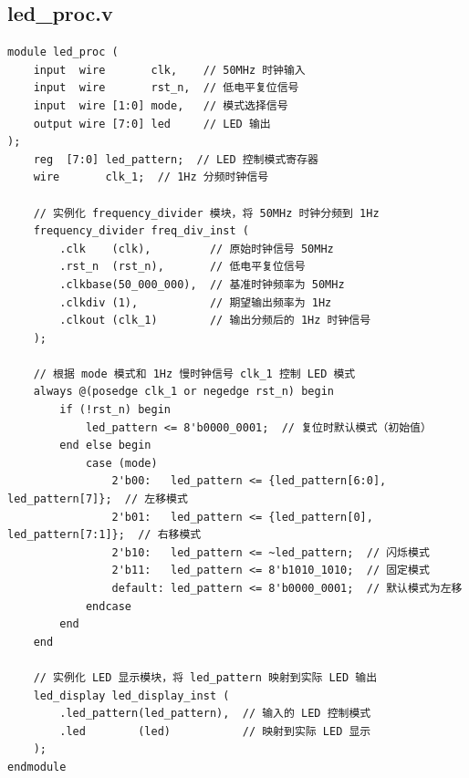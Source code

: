 \documentclass[a4paper,10pt]{article}
\begin{document}
\subsection{led_proc.v}
\begin{lstlisting}[caption=led_proc.v]
module led_proc (
    input  wire       clk,    // 50MHz 时钟输入
    input  wire       rst_n,  // 低电平复位信号
    input  wire [1:0] mode,   // 模式选择信号
    output wire [7:0] led     // LED 输出
);
    reg  [7:0] led_pattern;  // LED 控制模式寄存器
    wire       clk_1;  // 1Hz 分频时钟信号

    // 实例化 frequency_divider 模块，将 50MHz 时钟分频到 1Hz
    frequency_divider freq_div_inst (
        .clk    (clk),         // 原始时钟信号 50MHz
        .rst_n  (rst_n),       // 低电平复位信号
        .clkbase(50_000_000),  // 基准时钟频率为 50MHz
        .clkdiv (1),           // 期望输出频率为 1Hz
        .clkout (clk_1)        // 输出分频后的 1Hz 时钟信号
    );

    // 根据 mode 模式和 1Hz 慢时钟信号 clk_1 控制 LED 模式
    always @(posedge clk_1 or negedge rst_n) begin
        if (!rst_n) begin
            led_pattern <= 8'b0000_0001;  // 复位时默认模式（初始值）
        end else begin
            case (mode)
                2'b00:   led_pattern <= {led_pattern[6:0], led_pattern[7]};  // 左移模式
                2'b01:   led_pattern <= {led_pattern[0], led_pattern[7:1]};  // 右移模式
                2'b10:   led_pattern <= ~led_pattern;  // 闪烁模式
                2'b11:   led_pattern <= 8'b1010_1010;  // 固定模式
                default: led_pattern <= 8'b0000_0001;  // 默认模式为左移
            endcase
        end
    end

    // 实例化 LED 显示模块，将 led_pattern 映射到实际 LED 输出
    led_display led_display_inst (
        .led_pattern(led_pattern),  // 输入的 LED 控制模式
        .led        (led)           // 映射到实际 LED 显示
    );
endmodule

\end{lstlisting}
\end{document}
